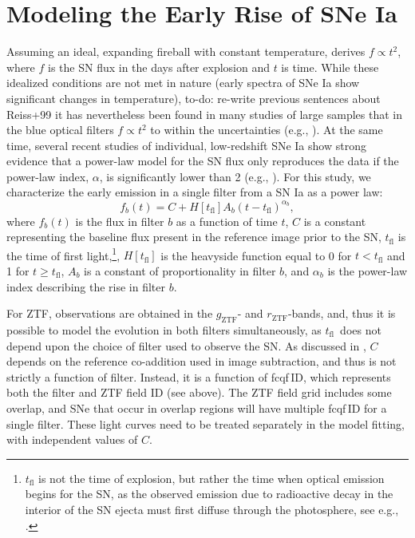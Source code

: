 \documentclass[twocolumn]{aastex63}
\newcommand{\todo}[1]{{\color{magenta} to-do: {#1}}}
\newcommand{\rztf}{$r_\mathrm{ZTF}$}
\newcommand{\gztf}{$g_\mathrm{ZTF}$}
\newcommand{\tfl}{$t_\mathrm{fl}$}
\begin{document}
\section{Modeling the Early Rise of SNe Ia \label{sec:model}}

Assuming an ideal, expanding fireball with constant temperature,
\citet{Arnett82} derives $f \propto t^2$, where $f$ is the SN flux in the
days after explosion and $t$ is time. While these idealized conditions are
not met in nature (early spectra of SNe Ia show significant changes in
temperature), \todo{re-write previous sentences about Reiss+99} it has
nevertheless been found in many studies of large samples that in the blue
optical filters $f \propto t^2$ to within the uncertainties (e.g.,
\citealt{Conley06, Hayden10, Ganeshalingam11}). At the same time, several
recent studies of individual, low-redshift SNe Ia show strong evidence that a
power-law model for the SN flux only reproduces the data if the power-law
index, $\alpha$, is significantly lower than 2 (e.g.,
\citealt{Zheng13,Zheng14,Shappee16,Miller18,Fausnaugh19}). For this study, we characterize the early emission in a single filter from a SN Ia as a
power law:
%
\begin{equation}
    f_b(t) = C + H[t_\mathrm{fl}] A_b (t - t_\mathrm{fl})^{\alpha_b},
    \label{eqn:flux_model}
\end{equation}
%
where $f_b(t)$ is the flux in filter $b$ as a function of time $t$, $C$ is a
constant representing the baseline flux present in the reference image prior
to the SN, $t_\mathrm{fl}$ is the time of first light,\footnote{$t_\mathrm{fl}$ is not the time of
explosion, but rather the time when optical emission begins for the SN, as
the observed emission due to radioactive decay in the interior of the SN
ejecta must first diffuse through the photosphere, see e.g.,
\citet{Piro13,Piro14}.}, $H[t_\mathrm{fl}]$ is the heavyside function equal
to 0 for $t < t_\mathrm{fl}$ and 1 for $t \ge t_\mathrm{fl}$, $A_b$ is a
constant of proportionality in filter $b$, and $\alpha_b$ is the power-law
index describing the rise in filter $b$.

For ZTF, observations are obtained in the \gztf- and \rztf-bands, and, thus
it is possible to model the evolution in both filters simultaneously, as
\tfl\ does not depend upon the choice of filter used to observe the SN. As
discussed in \citet{Yao19}, $C$ depends on the reference co-addition used in
image subtraction, and thus is not strictly a function of filter. Instead, it
is a function of fcqf\,ID, which represents both the filter and ZTF field ID (see above). The ZTF field grid includes some overlap, and SNe that occur in overlap regions will have multiple fcqf\,ID for a single filter. These light curves need to be treated separately in the model fitting, with independent values of $C$.
\end{document}
